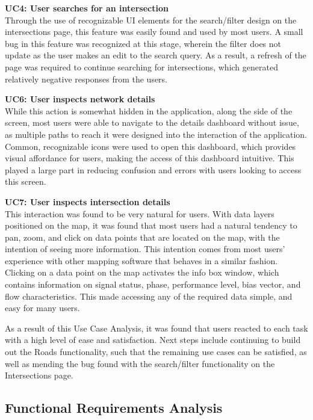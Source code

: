 \documentclass{report}
\begin{document}
\noindent \textbf{UC4: User searches for an intersection} \\
Through the use of  recognizable UI elements for the search/filter design on the intersections page, this feature was easily found and used by most users.
A small bug in this feature was recognized at this stage, wherein the filter does not update as the user makes an edit to the search query. 
As a result, a refresh of the page was required to continue searching for intersections, which generated relatively negative responses from the users.

\noindent \textbf{UC6: User inspects network details} \\
While this action is somewhat hidden in the application, along the side of the screen, most users were able to navigate to the details dashboard without issue, as multiple paths to reach it were designed into the interaction of the application.
Common, recognizable icons were used to open this dashboard, which provides visual affordance for users, making the access of this dashboard intuitive.
This played a large part in reducing confusion and errors with users looking to access this screen.

\noindent \textbf{UC7: User inspects intersection details} \\
This interaction was found to be very natural for users.
With data layers positioned on the map, it was found that most users had a natural tendency to pan, zoom, and click on data points that are located on the map, with the intention of seeing more information.
This intention comes from most users' experience with other mapping software that behaves in a similar fashion.
Clicking on a data point on the map activates the info box window, which contains information on signal status, phase, performance level, bias vector, and flow characteristics.
This made accessing any of the required data simple, and easy for many users.

As a result of this Use Case Analysis, it was found that users reacted to each task with a high level of ease and satisfaction.
Next steps include continuing to build out the Roads functionality, such that the remaining use cases can be satisfied, as well as mending the bug found with the search/filter functionality on the Intersections page.

\subsection{Functional Requirements Analysis}
\end{document}
